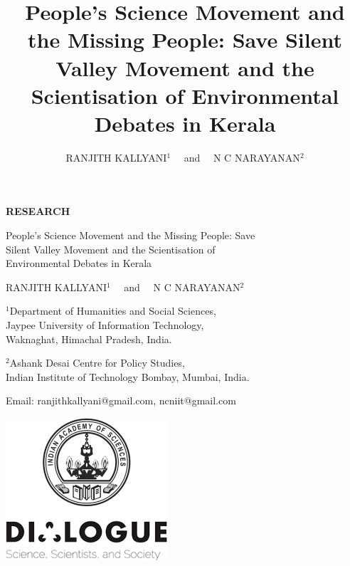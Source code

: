 \documentclass[twoside, 13pt]{article}
\title{People’s Science Movement and the Missing People: Save Silent Valley Movement and the Scientisation of Environmental Debates in Kerala}
\author{{\fontsize{14}{16}\selectfont RANJITH KALLYANI$^{1}$~~ and~~ N C NARAYANAN$^{2}$}}
\date{}
\begin{document}
  
  
  
  
\begin{titlepage}
   \begin{center}
   {\fontsize{14}{16}\selectfont
   {\large\textbf{RESEARCH}}}
   
       \vspace*{1cm}
      {\fontsize{24}{26}\selectfont
       {\LARGE People’s Science Movement and the Missing People: Save\\ Silent Valley Movement and the Scientisation of\\[0.2cm] Environmental Debates in Kerala}
}
       \vspace{0.7cm}
        
            
{\fontsize{14}{16}\selectfont
       {\large RANJITH KALLYANI$^{1}$~~ and~~ N C NARAYANAN$^{2}$}}

       \vspace{0.5cm}
       {\fontsize{14}{16}\selectfont     
      $^{1}$Department of Humanities and Social Sciences,\\ Jaypee University of Information Technology,\\ Waknaghat, Himachal Pradesh, India.
       
       $^{2}$Ashank Desai Centre for Policy Studies,\\ Indian Institute of Technology Bombay, Mumbai, India.
       
       \vspace{0.5cm}
       
       \begin{center}
		Email: ranjithkallyani@gmail.com, ncniit@gmail.com 
		\end{center}}
       
            
     
     \vfill
       \includegraphics{image/001.jpg}
            
            
   \end{center}
\end{titlepage}
\end{document}
